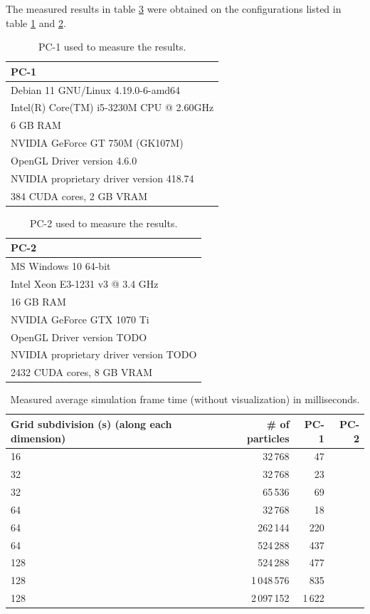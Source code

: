 \documentclass[a4paper,report]{IEEEtran}
\begin{document}
The measured results in table \ref{table:results} were obtained on the configurations listed in table \ref{table:pc1} and \ref{table:pc2}.
\begin{table}[!htbp]
	\begin{tabular}{l}
		\hline
		\textbf{PC-1} \\
		\hline
		Debian 11 GNU/Linux 4.19.0-6-amd64 \\
		Intel(R) Core(TM) i5-3230M CPU @ 2.60GHz \\
		6 GB RAM \\
		NVIDIA GeForce GT 750M (GK107M) \\
		OpenGL Driver version 4.6.0 \\
		NVIDIA proprietary driver version 418.74 \\
		384 CUDA cores, 2 GB VRAM \\
	\end{tabular}
	\caption{PC-1 used to measure the results.}
	\label{table:pc1}
\end{table}

\begin{table}[!htbp]
\begin{tabular}{l}
\hline
\textbf{PC-2} \\
\hline
	MS Windows 10 64-bit \\
	Intel Xeon E3-1231 v3 @ 3.4 GHz \\
	16 GB RAM \\
	NVIDIA GeForce GTX 1070 Ti \\
	OpenGL Driver version TODO \\
	NVIDIA proprietary driver version TODO \\
	2432 CUDA cores, 8 GB VRAM \\
\end{tabular}
	\caption{PC-2 used to measure the results.}
	\label{table:pc2}
\end{table}

\begin{table}
	\begin{tabularx}{1\linewidth}{X r r r}
\hline
		\textbf{Grid subdivision (s)} \newline (along each dimension) & \textbf{\# of particles} & \textbf{PC-1} & \textbf{PC-2} \\
\hline
	16  & 32\,768 & 47 & \\
	32  & 32\,768 & 23 & \\
	32  & 65\,536 & 69 & \\
	64  & 32\,768 & 18 & \\
	64  & 262\,144 & 220 & \\
	64  & 524\,288 & 437 & \\
	128 & 524\,288 & 477 & \\
	128 & 1\,048\,576 & 835 & \\
	128 & 2\,097\,152 & 1\,622 & \\
\hline
\end{tabularx}
	\caption{Measured average simulation frame time (without visualization) in milliseconds.}
	\label{table:results}
\end{table}
\end{document}
